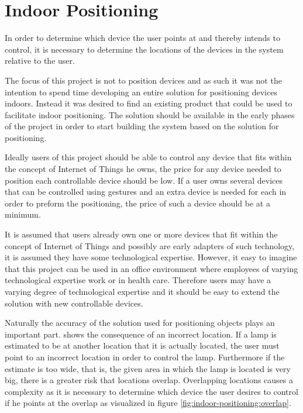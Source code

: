 \section{Indoor Positioning}\label{sec:indoor-positioning}
In order to determine which device the user points at and thereby intends to control, 
it is necessary to determine the locations of the devices in the system relative to the user.

The focus of this project is not to position devices and as such it was not the intention to spend time developing an entire solution for positioning devices indoors. 
Instead it was desired to find an existing product that could be used to facilitate indoor positioning.
The solution should be available in the early phases of the project in order to start building the system based on the solution for positioning.

Ideally users of this project should be able to control any device that fits within the concept of Internet of Things he owns, 
the price for any device needed to position each controllable device should be low. 
If a user owns several devices that can be controlled using gestures and an extra device is needed for each in order to preform the positioning, 
the price of such a device should be at a minimum.

It is assumed that users already own one or more devices that fit within the concept of Internet of Things and possibly are early adapters of such technology, 
it is assumed they have some technological expertise. 
However, it easy to imagine that this project can be used in an office environment where employees of varying technological expertise work or in health care. 
Therefore users may have a varying degree of technological expertise and it should be easy to extend the solution with new controllable devices.

Naturally the accuracy of the solution used for positioning objects plays an important part. 
 shows the consequence of an incorrect location. 
If a lamp is estimated to be at another location that it is actually located, 
the user must point to an incorrect location in order to control the lamp.
Furthermore if the estimate is too wide, that is, the given area in which the lamp is located is very big, 
there is a greater risk that locations overlap. 
Overlapping locations causes a complexity as it is necessary to determine which device the user desires to control if he points at the overlap as visualized in figure \ref{fig:indoor-positioning:overlap}.

